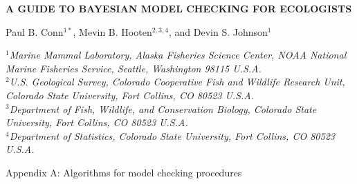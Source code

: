 \documentclass[12pt,english]{article}
\begin{document}
\begin{center} \bf {\large A GUIDE TO BAYESIAN MODEL CHECKING FOR ECOLOGISTS}

\vspace{0.7cm}
Paul B. Conn$^{1*}$, Mevin B. Hooten$^{2,3,4}$, and Devin S. Johnson$^1$
\end{center}
\vspace{0.5cm}

\rm
\small

\it $^1$Marine Mammal Laboratory, Alaska Fisheries Science Center,
NOAA National Marine Fisheries Service,
Seattle, Washington 98115 U.S.A.\\

\it $^2$U.S. Geological Survey, Colorado Cooperative Fish and Wildlife Research Unit, Colorado State University, Fort Collins, CO 80523 U.S.A.\\

\it $^3$Department of Fish, Wildlife, and Conservation Biology, Colorado State University, Fort Collins, CO 80523 U.S.A.\\

\it $^4$Department of Statistics, Colorado State University, Fort Collins, CO 80523 U.S.A.\\

\raggedbottom
\vspace{.5in}

\rm
Appendix A: Algorithms for model checking procedures
\bigskip

\vspace{.3in}

\doublespacing
\end{document}

